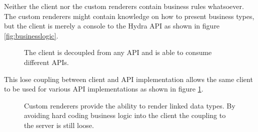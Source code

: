 Neither the client nor the custom renderers contain business rules whatsoever. The custom renderers might contain knowledge on how to present business types, but the client is merely a console to the Hydra API as shown in figure \ref{fig:businesslogic}.

\begin{figure}[!htb]
  \caption{The client is decoupled from any API and is able to consume different APIs.}
  \label{fig:losecoupling}
\end{figure}

This lose coupling between client and API implementation allows the same client to be used for various API implementations as shown in figure \ref{fig:losecoupling}.

\begin{figure}[!htb]
  \caption{Custom renderers provide the ability to render linked data types. By avoiding hard coding business logic into the client the coupling to the server is still loose.}
  \label{fig:linkeddata}
\end{figure}

